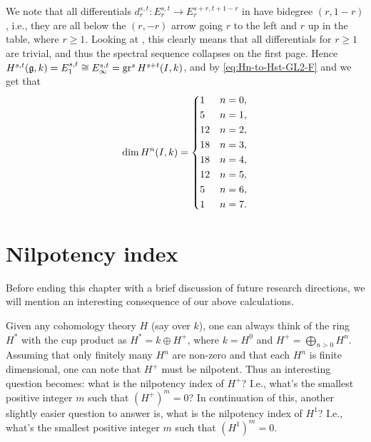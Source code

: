 We note that all differentials $d_{r}^{s,t} \colon E_{r}^{s,t} \to E_{r}^{s+r,t+1-r}$ in  have bidegree $(r,1-r)$, i.e., they are all below the $(r,-r)$ arrow going $r$ to the left and $r$ up in the table, where $r \geq 1$. Looking at , this clearly means that all differentials for $r \geq 1$ are trivial, and thus the spectral sequence collapses on the first page. Hence $H^{s,t}(\mathfrak{g},k) = E_{1}^{s,t} \cong E_{\infty}^{s,t} = \operatorname{gr}^{s} H^{s+t}(I,k)$, and by \eqref{eq:Hn-to-Hst-GL2-F} and  we get that
\begin{equation}
  \label{eq:dim-HnI-GL2-F}
  \dim H^{n}(I,k) =
  \begin{dcases}
    1 & n=0, \\
    5 & n=1, \\
    12 & n=2, \\
    18 & n=3, \\
    18 & n=4, \\
    12 & n=5, \\
    5 & n=6, \\
    1 & n=7.
  \end{dcases}
\end{equation}


\section{Nilpotency index}%
\label{sec:nilp-index}

Before ending this chapter with a brief discussion of future research directions, we will mention an interesting consequence of our above calculations.

Given any cohomology theory $H$ (say over $k$), one can always think of the ring $H^{*}$ with the cup product as $H^{*} = k \oplus H^{+}$, where $k = H^{0}$ and $H^{+} = \bigoplus_{n>0} H^{n}$. Assuming that only finitely many $H^{n}$ are non-zero and that each $H^{n}$ is finite dimensional, one can note that $H^{+}$ must be nilpotent. Thus an interesting question becomes: what is the nilpotency index of $H^{+}$? I.e., what's the smallest positive integer $m$ such that $(H^{+})^{m} = 0$? In continuation of this, another slightly easier question to answer is, what is the nilpotency index of $H^{1}$? I.e., what's the smallest positive integer $m$ such that $(H^{1})^{m} = 0$.


